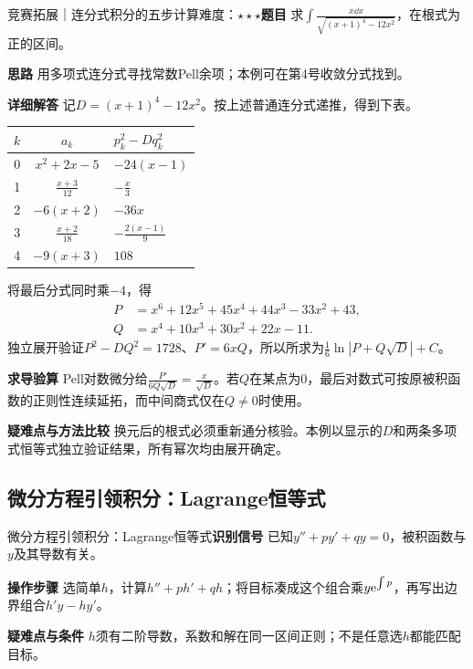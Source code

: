 \begin{example}{竞赛拓展｜连分式积分的五步计算}{难度：$\star\star\star$}\label{ic:ex:indefinite_algebra_complete:continuedfull}\textbf{题目} 求$\int \frac{x\dd x}{\sqrt{(x+1)^4-12x^2}}$，在根式为正的区间。\par \textbf{思路} 用多项式连分式寻找常数Pell余项；本例可在第4号收敛分式找到。\par \textbf{详细解答} 记$D=(x+1)^4-12x^2$。按上述普通连分式递推，得到下表。\par \noindent\begin{tabular}{ccl}\toprule $k$&$a_k$&$p_k^2-Dq_k^2$\\\midrule 0&$x^2+2x-5$&$-24(x-1)$\\1&$\frac{x+3}{12}$&$-\frac{x}{3}$\\2&$-6(x+2)$&$-36x$\\3&$\frac{x+2}{18}$&$-\frac{2(x-1)}{9}$\\4&$-9(x+3)$&$108$\\\bottomrule\end{tabular}\par 将最后分式同时乘$-4$，得\begin{align*}P&=x^6+12x^5+45x^4+44x^3-33x^2+43,\\Q&=x^4+10x^3+30x^2+22x-11.\end{align*}独立展开验证$P^2-DQ^2=1728$、$P'=6xQ$，所以所求为$\frac16\ln|P+Q\sqrt D|+C$。\par \textbf{求导验算} Pell对数微分给$\frac{P'}{6Q\sqrt D}=\frac{x}{\sqrt D}$。若$Q$在某点为0，最后对数式可按原被积函数的正则性连续延拓，而中间商式仅在$Q\ne0$时使用。\par \textbf{疑难点与方法比较} 换元后的根式必须重新通分核验。本例以显示的$D$和两条多项式恒等式独立验证结果，所有幂次均由展开确定。\end{example}

\subsection{微分方程引领积分：Lagrange恒等式}\label{ic:indefinite_algebra_complete:odeidentity}\begin{method}{微分方程引领积分：Lagrange恒等式}\textbf{识别信号} 已知$y''+py'+qy=0$，被积函数与$y$及其导数有关。\par \textbf{操作步骤} 选简单$h$，计算$h''+ph'+qh$；将目标凑成这个组合乘$y\mathrm{e}^{\int p}$，再写出边界组合$h'y-hy'$。\par \textbf{疑难点与条件} $h$须有二阶导数，系数和解在同一区间正则；不是任意选$h$都能匹配目标。\end{method}

